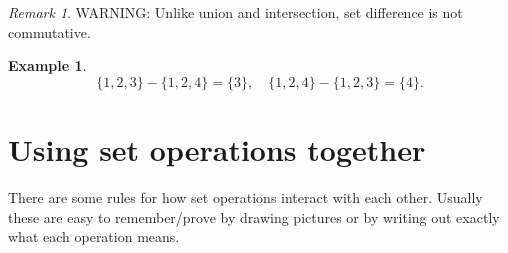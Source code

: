 \documentclass[
]{book}
\theoremstyle{definition}
\theoremstyle{definition}
\newtheorem{example}{Example}[chapter]
\theoremstyle{definition}
\theoremstyle{definition}
\theoremstyle{remark}
\newtheorem*{remark}{Remark}
\begin{document}
\begin{remark}
WARNING: Unlike union and intersection, set difference is not commutative.
\end{remark}

\begin{example}
\[ \{1,2,3\} - \{1,2,4\} = \{3\}, \quad \{1,2,4\} - \{1,2,3\} = \{4\}.\]
\end{example}

\section{Using set operations together}\label{using-set-operations-together}

There are some rules for how set operations interact with each other. Usually these are easy to remember/prove by drawing pictures or by writing out exactly what each operation means.
\end{document}
